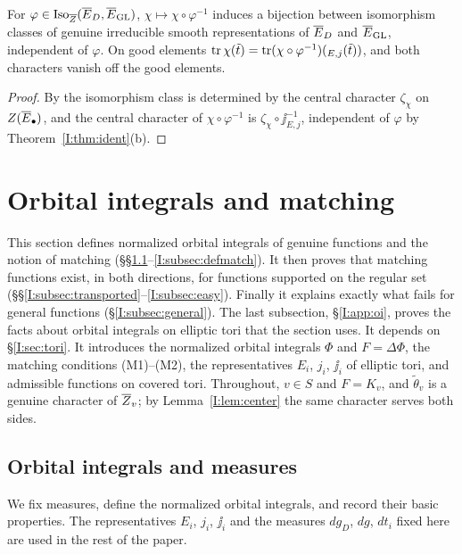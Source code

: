 \begin{corollary}\label{I:cor:reps}
For $\varphi\in\operatorname{Iso}_{\overline{Z}}(\overline{E}_D,\overline{E}_{\mathrm{GL}})$, $\chi\mapsto\chi\circ\varphi^{-1}$ induces a bijection between isomorphism classes of genuine irreducible smooth representations of $\overline{E}_D$ and $\overline{E}_{\mathrm{GL}}$, independent of $\varphi$. On good elements $\operatorname{tr}\chi(\tilde t)=\operatorname{tr}(\chi\circ\varphi^{-1})(\relax_{E,j}(\tilde t))$, and both characters vanish off the good elements.
\end{corollary}
\begin{proof}
By \cite[Prop.~2.4]{JC26a} the isomorphism class is determined by the central character $\zeta_\chi$ on $Z(\overline{E}_\bullet)$, and the central character of $\chi\circ\varphi^{-1}$ is $\zeta_\chi\circ\jj_{E,j}^{-1}$, independent of $\varphi$ by Theorem~\ref{I:thm:ident}(b).
\end{proof}

\section{Orbital integrals and matching}\label{I:sec:matching}
This section defines normalized orbital integrals of genuine functions and the notion of matching (\S\S\ref{I:subsec:oi}--\ref{I:subsec:defmatch}). It then proves that matching functions exist, in both directions, for functions supported on the regular set (\S\S\ref{I:subsec:transported}--\ref{I:subsec:easy}). Finally it explains exactly what fails for general functions (\S\ref{I:subsec:general}). The last subsection, \S\ref{I:app:oi}, proves the facts about orbital integrals on elliptic tori that the section uses. It depends on \S\ref{I:sec:tori}. It introduces the normalized orbital integrals $\Phi$ and $F=\Delta\Phi$, the matching conditions (M1)--(M2), the representatives $E_i$, $j_i$, $\jj_i$ of elliptic tori, and admissible functions on covered tori. Throughout, $v\in S$ and $F=K_v$, and $\tilde\theta_v$ is a genuine character of $\overline{Z}_v$; by Lemma~\ref{I:lem:center} the same character serves both sides.

\subsection{Orbital integrals and measures}\label{I:subsec:oi}
We fix measures, define the normalized orbital integrals, and record their basic properties. The representatives $E_i$, $j_i$, $\jj_i$ and the measures $dg_D$, $dg$, $dt_i$ fixed here are used in the rest of the paper.

